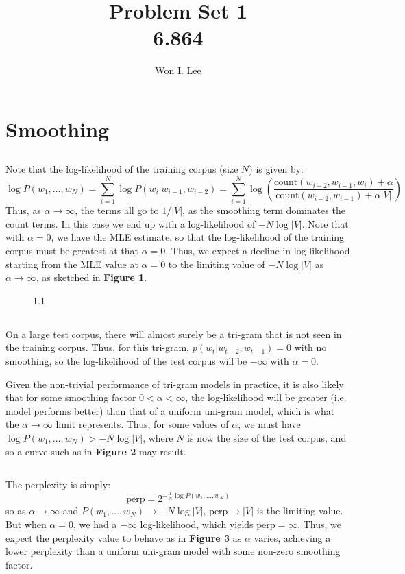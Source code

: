 \documentclass[psamsfonts]{amsart}
\title{Problem Set 1 \\ 6.864}
\author{Won I. Lee}
\theoremstyle{definition}
\theoremstyle{remark}
\numberwithin{equation}{section}
\begin{document}
	
\maketitle

\section{Smoothing}

\subsection{} Note that the log-likelihood of the training corpus (size $N$) is given by:
$$\log P(w_1, \dots, w_N) = \sum_{i=1}^N \log P(w_i|w_{i-1}, w_{i-2}) = \sum_{i=1}^N \log\left(\frac{\text{count}(w_{i-2}, w_{i-1}, w_i) + \alpha}{\text{count}(w_{i-2}, w_{i-1}) + \alpha |V|}\right)$$
Thus, as $\alpha\rightarrow\infty$, the terms all go to $1/|V|$, as the smoothing term dominates the count terms. In this case we end up with a log-likelihood of $-N\log|V|$. Note that with $\alpha = 0$, we have the MLE estimate, so that the log-likelihood of the training corpus must be greatest at that $\alpha = 0$. Thus, we expect a decline in log-likelihood starting from the MLE value at $\alpha = 0$ to the limiting value of $-N\log|V|$ as $\alpha \rightarrow \infty$, as sketched in {\bf Figure 1}.

\begin{figure}
	\caption{1.1}
\end{figure}

\subsection{} On a large test corpus, there will almost surely be a tri-gram that is not seen in the training corpus. Thus, for this tri-gram, $p(w_t|w_{t-2},w_{t-1}) = 0$ with no smoothing, so the log-likelihood of the test corpus will be $-\infty$ with $\alpha = 0$.

Given the non-trivial performance of tri-gram models in practice, it is also likely that for some smoothing factor $0 <\alpha < \infty$, the log-likelihood will be greater (i.e. model performs better) than that of a uniform uni-gram model, which is what the $\alpha\rightarrow\infty$ limit represents. Thus, for some values of $\alpha$, we must have $\log P(w_1, \dots, w_N) > -N\log|V|$, where $N$ is now the size of the test corpus, and so a curve such as in {\bf Figure 2} may result.

\subsection{} The perplexity is simply:
$$\text{perp} = 2^{-\frac{1}{N} \log P(w_1, \dots, w_N)}$$
so as $\alpha \rightarrow\infty$ and $P(w_1, \dots, w_N) \rightarrow -N\log |V|$, $\text{perp} \rightarrow |V|$ is the limiting value. But when $\alpha = 0$, we had a $-\infty$ log-likelihood, which yields $\text{perp} = \infty$. Thus, we expect the perplexity value to behave as in {\bf Figure 3} as $\alpha$ varies, achieving a lower perplexity than a uniform uni-gram model with some non-zero smoothing factor.
\end{document}
